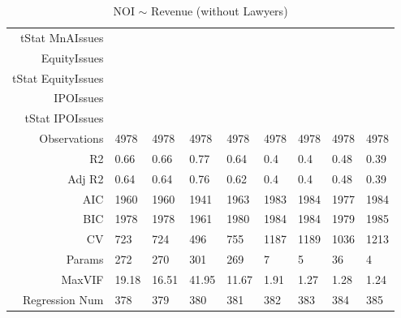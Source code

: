 \begin{table}[ht]
\begin{tabular}{rllllllll}
  tStat MnAIssues &  &  &  &  &  &  &  &  \\ 
  EquityIssues &  &  &  &  &  &  &  &  \\ 
  tStat EquityIssues &  &  &  &  &  &  &  &  \\ 
  IPOIssues &  &  &  &  &  &  &  &  \\ 
  tStat IPOIssues &  &  &  &  &  &  &  &  \\ 
  Observations & 4978 & 4978 & 4978 & 4978 & 4978 & 4978 & 4978 & 4978 \\ 
  R2 & 0.66 & 0.66 & 0.77 & 0.64 & 0.4 & 0.4 & 0.48 & 0.39 \\ 
  Adj R2 & 0.64 & 0.64 & 0.76 & 0.62 & 0.4 & 0.4 & 0.48 & 0.39 \\ 
  AIC & 1960 & 1960 & 1941 & 1963 & 1983 & 1984 & 1977 & 1984 \\ 
  BIC & 1978 & 1978 & 1961 & 1980 & 1984 & 1984 & 1979 & 1985 \\ 
  CV & 723 & 724 & 496 & 755 & 1187 & 1189 & 1036 & 1213 \\ 
  Params & 272 & 270 & 301 & 269 & 7 & 5 & 36 & 4 \\ 
  MaxVIF & 19.18 & 16.51 & 41.95 & 11.67 & 1.91 & 1.27 & 1.28 & 1.24 \\ 
  Regression Num & 378 & 379 & 380 & 381 & 382 & 383 & 384 & 385 \\ 
   \hline
\end{tabular}
\caption{NOI $\sim$ Revenue (without Lawyers)} 
\end{table}
